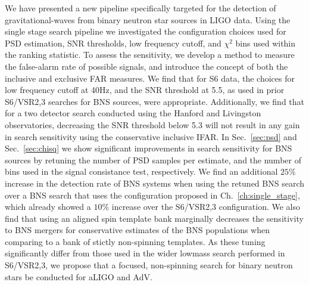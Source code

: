 We have presented a new pipeline specifically targeted for the detection of gravitational-waves from binary neutron star sources in LIGO data. Using the single stage search pipeline we investigated the configuration choices used for PSD estimation, SNR thresholds, low frequency cutoff, and $\chi^2$ bins used within the ranking statistic. To assess the sensitivity, we develop a method to measure the false-alarm rate of possible signals, and introduce the concept of both the inclusive and exclusive FAR measures. We find that for S6 data, the choices for low frequency cutoff at 40Hz, and the SNR threshold at 5.5, as used in prior S6/VSR2,3 searches for BNS sources, were appropriate. Additionally, we find that for a two detector search conducted using the Hanford and Livingston observatories, decreasing the SNR threshold below 5.3 will not result in any gain in search sensitivity using the conservative inclusive IFAR. In Sec.~\ref{sec:psd} and Sec.~\ref{sec:chisq} we show significant improvements in search sensitivity for BNS sources by retuning the number of PSD samples per estimate, and the number of bins used in the signal consistance test, respectively. We find an additional $25\%$ increase in the detection rate of BNS systems when using the retuned BNS search over a BNS search that uses the configuration proposed in Ch.~\ref{ch:single_stage}, which already showed a $10\%$ increase over the S6/VSR2,3 configuration. We also find that using an aligned spin template bank marginally decreases the sensitivity 
to BNS mergers for conservative estimates of the BNS populations when comparing to a bank of stictly non-spinning templates. As these tuning significantly differ from those used in the wider lowmass search performed in S6/VSR2,3, we propose that a focused, non-spinning search for binary neutron stars be conducted for aLIGO and AdV.
